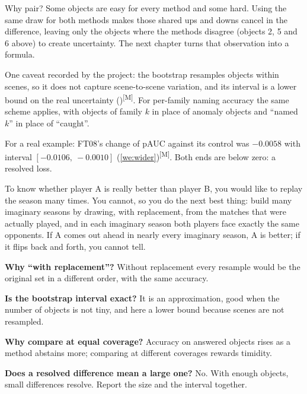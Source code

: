 \documentclass[11pt,a4paper,oneside,openany]{book}
\newcommand{\meas}{\textsuperscript{\textsf{\scriptsize[M]}}}
\begin{document}
Why pair? Some objects are easy for every method and some hard. Using the same draw for both methods makes those shared ups and downs cancel in the difference, leaving only the
objects where the methods disagree (objects 2, 5 and 6 above) to create uncertainty. The next chapter turns that observation into a formula.

One caveat recorded by the project: the bootstrap resamples objects within scenes, so it does not capture scene-to-scene variation, and its interval is a lower bound on the real
uncertainty ()\meas. For per-family naming accuracy the same scheme applies, with objects of family $k$ in place of anomaly
objects and ``named $k$'' in place of ``caught''.

For a real example: FT08's change of pAUC against its control was $-0.0058$ with interval $[-0.0106,\ -0.0010]$ (\cref{we:wider})\meas. Both ends are below zero: a resolved loss.

\begin{analogy}
To know whether player A is really better than player B, you would like to replay the season many times. You cannot, so you do the next best thing: build many imaginary
seasons by drawing, with replacement, from the matches that were actually played, and in each imaginary season both players face exactly the same opponents. If A comes out
ahead in nearly every imaginary season, A is better; if it flips back and forth, you cannot tell.
\end{analogy}

\begin{confusions}
\textbf{Why ``with replacement''?} Without replacement every resample would be the original set in a different order, with the same accuracy.

\textbf{Is the bootstrap interval exact?} It is an approximation, good when the number of objects is not tiny, and here a lower bound because scenes are not resampled.

\textbf{Why compare at equal coverage?} Accuracy on answered objects rises as a method abstains more; comparing at different coverages rewards timidity.

\textbf{Does a resolved difference mean a large one?} No. With enough objects, small differences resolve. Report the size and the interval together.
\end{confusions}
\end{document}
